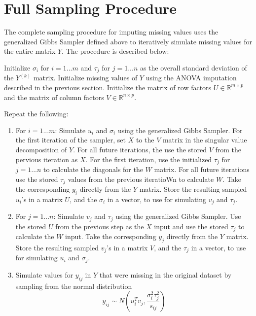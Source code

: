 \documentclass[12pt,twoside]{dukestatscithesis}
\theoremstyle{definition}
\theoremstyle{definition}
\theoremstyle{definition}
\theoremstyle{remark}
\begin{document}
\section{Full Sampling Procedure}\label{full-sampling-procedure}

The complete sampling procedure for imputing missing values uses the
generalized Gibbs Sampler defined above to iteratively simulate missing
values for the entire matrix \(Y\). The procedure is described below:

Initialize \(\sigma_i\) for \(i = 1 ... m\) and \(\tau_j\) for
\(j = 1 ... n\) as the overall standard deviation of the \(Y^{(k)}\)
matrix. Initialize missing values of \(Y\) using the ANOVA imputation
described in the previous section. Initialize the matrix of row factors
\(U \in \mathbb{R}^{m \times p}\) and the matrix of column factors
\(V \in \mathbb{R}^{n \times p}\).

Repeat the following:
\begin{enumerate}
\def\labelenumi{\arabic{enumi}.}
\item
  For \(i = 1 ... m\): Simulate \(u_i\) and \(\sigma_i\) using the
  generalized Gibbs Sampler. For the first iteration of the sampler, set
  \(X\) to the \(V\) matrix in the singular value decomposition of
  \(Y\). For all future iterations, the use the stored \(V\) from the
  pervious iteration as \(X\). For the first iteration, use the
  initialized \(\tau_j\) for \(j = 1 ... n\) to calculate the diagonals
  for the \(W\) matrix. For all future iterations use the stored
  \(\tau_j\) values from the previous iteratioWn to calculate \(W\).
  Take the corresponding \(y_i\) directly from the \(Y\) matrix. Store
  the resulting sampled \(u_i\)'s in a matrix \(U\), and the
  \(\sigma_i\) in a vector, to use for simulating \(v_j\) and
  \(\tau_j\).
\item
  For \(j = 1 ... n\): Simulate \(v_j\) and \(\tau_j\) using the
  generalized Gibbs Sampler. Use the stored \(U\) from the previous step
  as the \(X\) input and use the stored \(\tau_j\) to calculate the
  \(W\) input. Take the corresponding \(y_j\) directly from the \(Y\)
  matrix. Store the resulting sampled \(v_j\)'s in a matrix \(V\), and
  the \(\tau_j\) in a vector, to use for simulating \(u_i\) and
  \(\sigma_j\).
\item
  Simulate values for \(y_{ij}\) in \(Y\) that were missing in the
  original dataset by sampling from the normal distribution
  \[y_{ij} \sim N(u_i^Tv_j, \frac{\sigma_i^2\tau_j^2}{s_{ij}})\]
\end{enumerate}
\end{document}
